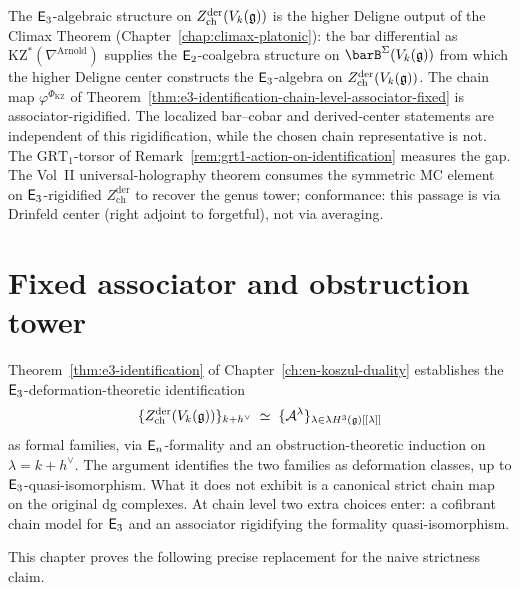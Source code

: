 \begin{remark}
\label{rem:e3-id-bridge}
The $\mathsf{E}_3$-algebraic structure on
$Z^{\mathrm{der}}_{\mathrm{ch}}(V_k(\mathfrak{g}))$ is the higher Deligne
output of the Climax Theorem
(Chapter~\ref{chap:climax-platonic}): the bar differential as
$\mathrm{KZ}^*(\nabla^{\mathrm{Arnold}})$ supplies the
$\mathsf{E}_2$-coalgebra structure on $\barB^{\Sigma}(V_k(\fg))$ from
which the higher Deligne center constructs the $\mathsf{E}_3$-algebra
on $Z^{\mathrm{der}}_{\mathrm{ch}}(V_k(\mathfrak{g}))$. The chain map
$\varphi^{\Phi_{\mathrm{KZ}}}$ of
Theorem~\ref{thm:e3-identification-chain-level-associator-fixed}
is associator-rigidified. The localized bar--cobar and derived-center
statements are independent of this rigidification, while the chosen
chain representative is not. The
$\mathrm{GRT}_1$-torsor of
Remark~\ref{rem:grt1-action-on-identification} measures the gap.
The Vol~II universal-holography theorem
consumes the symmetric MC element on
$\mathsf{E}_3$-rigidified $Z^{\mathrm{der}}_{\mathrm{ch}}$ to recover
the genus tower; conformance: this passage is via
Drinfeld center (right adjoint to forgetful), not via averaging.
\end{remark}

\section*{Fixed associator and obstruction tower}

Theorem~\ref{thm:e3-identification} of
Chapter~\ref{ch:en-koszul-duality} establishes the
$\mathsf{E}_3$-deformation-theoretic identification
\[
 \{Z^{\mathrm{der}}_{\mathrm{ch}}(V_k(\mathfrak{g}))\}_{k + h^\vee}
 \;\simeq\;
 \{\mathcal{A}^\lambda\}_{\lambda \in \lambda H^3(\mathfrak{g})[[\lambda]]}
\]
as formal families, via $\mathsf{E}_n$-formality and an
obstruction-theoretic induction on~$\lambda = k + h^\vee$. The
argument identifies the two families as deformation classes, up
to $\mathsf{E}_3$-quasi-isomorphism. What it does not exhibit is a
canonical strict chain map on the original dg complexes. At chain
level two extra choices enter: a cofibrant chain model for
$\mathsf{E}_3$ and an associator rigidifying the formality
quasi-isomorphism.

This chapter proves the following precise replacement for the
naive strictness claim.

